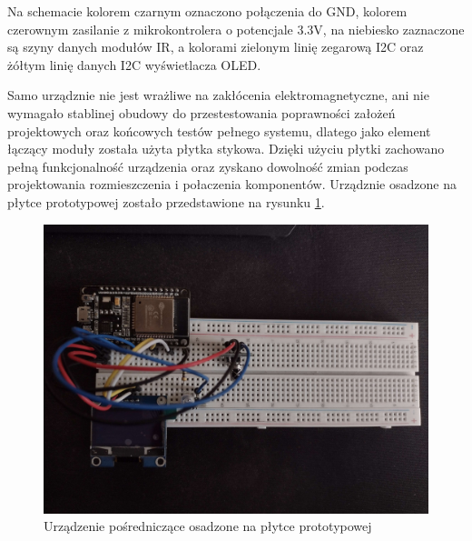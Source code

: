 \documentclass[12pt,twoside]{article}
\begin{document}
Na schemacie kolorem czarnym oznaczono połączenia do GND, kolorem czerownym zasilanie z mikrokontrolera o potencjale 3.3V, na niebiesko zaznaczone są szyny danych modułów IR, a kolorami zielonym linię zegarową I2C oraz żółtym linię danych I2C wyświetlacza OLED.

Samo urządznie nie jest wrażliwe na zakłócenia elektromagnetyczne, ani nie wymagało stablinej obudowy do przestestowania poprawności założeń projektowych oraz końcowych testów pełnego systemu, dlatego jako element łączący moduły została użyta płytka stykowa. Dzięki użyciu płytki zachowano pełną funkcjonalność urządzenia oraz zyskano dowolność zmian podczas projektowania rozmieszczenia i połaczenia komponentów. Urządznie osadzone na płytce prototypowej zostało przedstawione na rysunku \ref*{Fig:deviceOnBoard}.
\begin{figure}[ht]
   \centering
   \includegraphics[width=12cm]{images/deviceOnBoard.jpg}
   \caption{Urządzenie pośredniczące osadzone na płytce prototypowej}
   \label{Fig:deviceOnBoard}
\end{figure}
\end{document}
